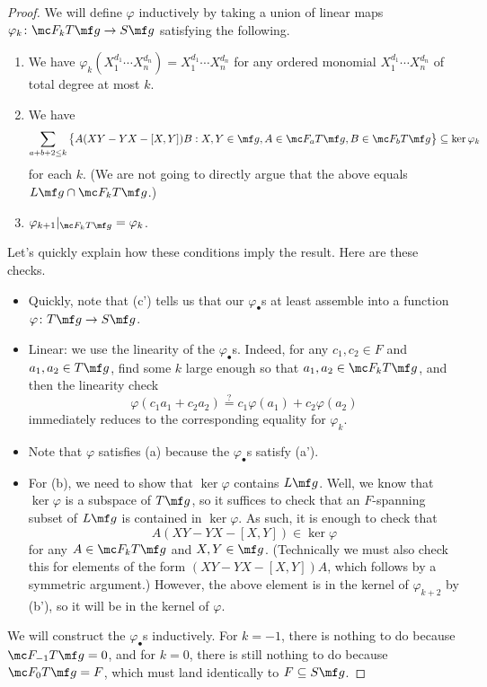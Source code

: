 \documentclass[../notes.tex]{subfiles}
\begin{document}
\begin{proof}
	We will define $\varphi$ inductively by taking a union of linear maps $\varphi_k\colon\mc F_kT\mf g\to S\mf g$ satisfying the following.
	\begin{enumerate}[label=(\alph*')]
		\item We have $\varphi_k\left(X_1^{d_1}\cdots X_n^{d_n}\right)=X_1^{d_1}\cdots X_n^{d_n}$ for any ordered monomial $X_1^{d_1}\cdots X_n^{d_n}$ of total degree at most $k$.
		\item We have \[\sum_{a+b+2\le k}\big\{A(XY-YX-[X,Y])B:X,Y\in\mf g,A\in\mc F_{a}T\mf g,B\in\mc F_bT\mf g\big\}\subseteq\ker\varphi_k\]
		for each $k$. (We are not going to directly argue that the above equals $L\mf g\cap\mc F_kT\mf g$.)
		\item $\varphi_{k+1}|_{\mc F_kT\mf g}=\varphi_k$.
	\end{enumerate}
	Let's quickly explain how these conditions imply the result. Here are these checks.
	\begin{itemize}
		\item Quickly, note that (c') tells us that our $\varphi_\bullet$s at least assemble into a function $\varphi\colon T\mf g\to S\mf g$.
		\item Linear: we use the linearity of the $\varphi_\bullet$s. Indeed, for any $c_1,c_2\in F$ and $a_1,a_2\in T\mf g$, find some $k$ large enough so that $a_1,a_2\in\mc F_kT\mf g$, and then the linearity check
		\[\varphi(c_1a_1+c_2a_2)\stackrel?=c_1\varphi(a_1)+c_2\varphi(a_2)\]
		immediately reduces to the corresponding equality for $\varphi_k$.
		\item Note that $\varphi$ satisfies (a) because the $\varphi_\bullet$s satisfy (a').
		\item For (b), we need to show that $\ker\varphi$ contains $L\mf g$. Well, we know that $\ker\varphi$ is a subspace of $T\mf g$, so it suffices to check that an $F$-spanning subset of $L\mf g$ is contained in $\ker\varphi$. As such, it is enough to check that
		\[A(XY-YX-[X,Y])\in\ker\varphi\]
		for any $A\in\mc F_kT\mf g$ and $X,Y\in\mf g$. (Technically we must also check this for elements of the form $(XY-YX-[X,Y])A$, which follows by a symmetric argument.) However, the above element is in the kernel of $\varphi_{k+2}$ by (b'), so it will be in the kernel of $\varphi$.
	\end{itemize}
	We will construct the $\varphi_\bullet$s inductively. For $k=-1$, there is nothing to do because $\mc F_{-1}T\mf g=0$, and for $k=0$, there is still nothing to do because $\mc F_0T\mf g=F$, which must land identically to $F\subseteq S\mf g$.


\end{proof}
\end{document}
